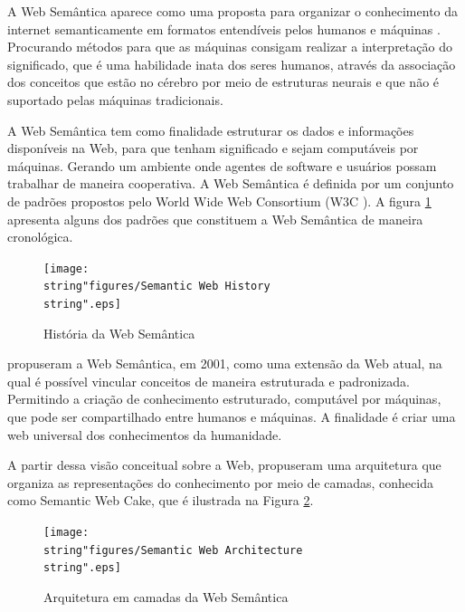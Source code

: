 A Web Semântica aparece como uma proposta para organizar o conhecimento
da internet semanticamente em formatos entendíveis pelos humanos e
máquinas \citep{bernerslee2001}. Procurando métodos para que as máquinas
consigam realizar a interpretação do significado, que é uma habilidade
inata dos seres humanos, através da associação dos conceitos que estão
no cérebro por meio de estruturas neurais e que não é suportado pelas
máquinas tradicionais.

A Web Semântica tem como finalidade estruturar os dados e informações
disponíveis na Web, para que tenham significado e sejam computáveis
por máquinas. Gerando um ambiente onde agentes de software e usuários
possam trabalhar de maneira cooperativa. A Web Semântica é definida
por um conjunto de padrões propostos pelo \foreignlanguage{english}{World
Wide Web Consortium} (W3C ).
A figura \ref{fig:Semantic_Web_History} apresenta alguns dos padrões
que constituem a Web Semântica de maneira cronológica. 

\begin{figure}[H]
\begin{centering}
\texttt{[image: \\string"figures/Semantic Web History\\string".eps]}
\par\end{centering}
\caption{História da Web Semântica \label{fig:Semantic_Web_History}}

\end{figure}

\citet{bernerslee2001} propuseram a Web Semântica, em 2001, como
uma extensão da Web atual, na qual é possível vincular conceitos de
maneira estruturada e padronizada. Permitindo a criação de conhecimento
estruturado, computável por máquinas, que pode ser compartilhado entre
humanos e máquinas. A finalidade é criar uma web universal dos conhecimentos
da humanidade. 

A partir dessa visão conceitual sobre a Web, \citet{bernerslee2001}
propuseram uma arquitetura que organiza as representações do conhecimento
por meio de camadas, conhecida como \foreignlanguage{english}{Semantic
Web Cake,} que é ilustrada na Figura \ref{fig:Web-Semantic-Architecture}.

\begin{figure}[H]
\begin{centering}
\texttt{[image: \\string"figures/Semantic Web Architecture\\string".eps]}\caption{Arquitetura em camadas da Web Semântica\label{fig:Web-Semantic-Architecture}}
\par\end{centering}
\end{figure}

